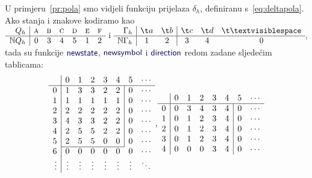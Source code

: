 \begin{primjer}\label{pr:polatable}
U primjeru~\ref{pr:pola} smo vidjeli funkciju prijelaza $\delta_h$, definiranu s~\eqref{eq:deltapola}. Ako stanja i znakove kodiramo kao
$
    \begin{array}{r|cccccc}
         Q_h& \textsc a& \textsc b& \textsc c& \textsc d& \textsc e& \textsc f \\\hline
         \N Q_h& 0 & 3 & 4 & 5 & 1 & 2
    \end{array}\text{ i }
    \begin{array}{r|cc|ccc}
        \Gamma_h& \t a & \t b & \t c & \t d & \bl \\\hline
        \N\Gamma_h & 1 & 2 & 3 & 4 & 0
    \end{array}\text,
    $
tada su funkcije $\f{newstate}$, $\f{newsymbol}$ i $\f{direction}$ redom zadane sljedećim tablicama:
\begin{equation*}
\begin{array}{r|ccccccc}
    &0&1&2&3&4&5&\cdots\\\hline
0& 1 & 3 & 3 & 2 & 2 & \multicolumn{1}{|c}{0} & \cdots\\
1& 1 & 1 & 1 & 1 & 1 & \multicolumn{1}{|c}{0} & \cdots\\
2& 2 & 2 & 2 & 2 & 2 & \multicolumn{1}{|c}{0} & \cdots\\
3& 4 & 3 & 3 & 2 & 2 & \multicolumn{1}{|c}{0} & \cdots\\
4& 2 & 5 & 5 & 2 & 2 & \multicolumn{1}{|c}{0} & \cdots\\
5& 2 & 5 & 5 & 0 & 0 & \multicolumn{1}{|c}{0} & \cdots\\ \cline{2-6}
6& 0 & 0 & 0 & 0 & 0 & 0 & \cdots\\
\vdots&\vdots&\vdots&\vdots&\vdots&\vdots&\vdots&\ddots
\end{array}\text,%
\begin{array}{r|ccccccc}
    &0&1&2&3&4&5&\cdots\\\hline
0& 0 & 3 & 4 & 3 & 4 & \multicolumn{1}{|c}{0} & \cdots\\
1& 0 & 1 & 2 & 3 & 4 & \multicolumn{1}{|c}{0} & \cdots\\
2& 0 & 1 & 2 & 3 & 4 & \multicolumn{1}{|c}{0} & \cdots\\
3& 0 & 1 & 2 & 3 & 4 & \multicolumn{1}{|c}{0} & \cdots\\
4& 0 & 0 & 0 & 3 & 4 & \multicolumn{1}{|c}{0} & \cdots\\

\end{array}
\end{equation*}
\end{primjer}
